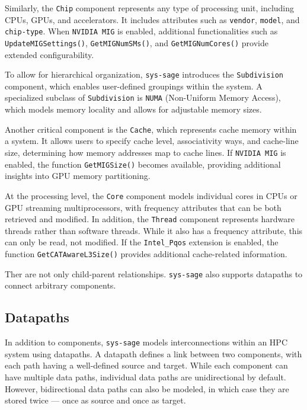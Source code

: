 Similarly, the \texttt{Chip} component represents any type of processing unit, including CPUs, GPUs, and accelerators. It includes attributes such as \texttt{vendor}, \texttt{model}, and \texttt{chip-type}. When \texttt{NVIDIA MIG} is enabled, additional functionalities such as \texttt{UpdateMIGSettings()}, \texttt{GetMIGNumSMs()}, and \texttt{GetMIGNumCores()} provide extended configurability. \cite[see Chip]{sys-sage-docu}

To allow for hierarchical organization, \texttt{sys-sage} introduces the \texttt{Subdivision} component, which enables user-defined groupings within the system. A specialized subclass of \texttt{Subdivision} is \texttt{NUMA} (Non-Uniform Memory Access), which models memory locality and allows for adjustable memory sizes. \cite[see Subdivision, NUMA]{sys-sage-docu}  

Another critical component is the \texttt{Cache}, which represents cache memory within a system. It allows users to specify cache level, associativity ways, and cache-line size, determining how memory addresses map to cache lines. If \texttt{NVIDIA MIG} is enabled, the function \texttt{GetMIGSize()} becomes available, providing additional insights into GPU memory partitioning. \cite[see Cache]{sys-sage-docu}

At the processing level, the \texttt{Core} component models individual cores in CPUs or GPU streaming multiprocessors, with frequency attributes that can be both retrieved and modified. In addition, the \texttt{Thread} component represents hardware threads rather than software threads. While it also has a frequency attribute, this can only be read, not modified. If the \texttt{Intel\_Pqos} extension is enabled, the function \texttt{GetCATAwareL3Size()} provides additional cache-related information. \cite[see Core, Thread]{sys-sage-docu}

Ther are not only child-parent relationships. \texttt{sys-sage} also supports datapaths to connect arbitrary components.

\subsection{Datapaths}

In addition to components, \texttt{sys-sage} models interconnections within an \ac{HPC} system using datapaths. A datapath defines a link between two components, with each path having a well-defined source and target. While each component can have multiple data paths, individual data paths are unidirectional by default. However, bidirectional data paths can also be modeled, in which case they are stored twice — once as source and once as target. \cite[see Data Path]{sys-sage-docu}

